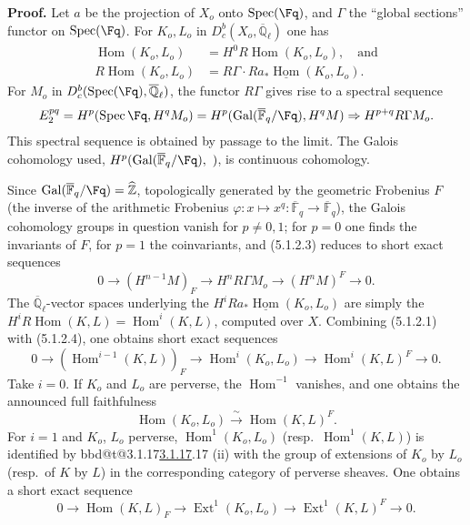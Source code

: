 \documentclass[12pt,oneside]{amsbook}
\makeatletter
\DeclareRobustCommand{\rn}[1]{%
  \ifcsname bbd@t@#1\endcsname\hyperlink{bbd:#1}{#1}\else#1\fi}
\theoremstyle{plain}
\theoremstyle{definition}
\newcommand{\Z}{\mathbb{Z}}   \newcommand{\D}{\mathcal{D}}
\newcommand{\Fbar}{\overline{\mathbb{F}}_{q}}
\newcommand{\Qlb}{\overline{\mathbb{Q}}_{\ell}}
\newcommand{\Dbc}{D^{b}_{c}}
\DeclareMathOperator{\Hom}{Hom}
\DeclareMathOperator{\Ext}{Ext}
\DeclareMathOperator{\Spec}{Spec}
\DeclareMathOperator{\Gal}{Gal}
\newcommand{\uHom}{\underline{\operatorname{Hom}}}
\makeatother
\begin{document}
\noindent\textbf{Proof.} Let $a$ be the projection of $X_{o}$ onto $\Spec(\Fq)$, and $\Gamma$ the ``global sections'' functor on $\Spec(\Fq)$. For $K_{o},L_{o}$ in $\Dbc(X_{o},\Qlb)$ one has
\begin{align}
  \Hom(K_{o},L_{o}) &= H^{0}R\Hom(K_{o},L_{o}),\quad\text{and}\\
  R\Hom(K_{o},L_{o}) &= R\Gamma\cdot Ra_{*}\uHom(K_{o},L_{o}).
\end{align}
For $M_{o}$ in $\Dbc(\Spec(\Fq),\Qlb)$, the functor $R\Gamma$ gives rise to a spectral sequence
\begin{equation}
  E^{pq}_{2}=H^{p}(\Spec\Fq,H^{q}M_{o})
  = H^{p}(\Gal(\Fbar/\Fq),H^{q}M)\Rightarrow H^{p+q}R\Gamma M_{o}.
\end{equation}
This spectral sequence is obtained by passage to the limit. The Galois cohomology used, $H^{p}(\Gal(\Fbar/\Fq),\ )$, is continuous cohomology.

Since $\Gal(\Fbar/\Fq)=\widehat{\Z}$, topologically generated by the geometric Frobenius $F$ (the inverse of the arithmetic Frobenius $\varphi:x\mapsto x^{q}:\Fbar\to\Fbar$), the Galois cohomology groups in question vanish for $p\ne 0,1$; for $p=0$ one finds the invariants of $F$, for $p=1$ the coinvariants, and (5.1.2.3) reduces to short exact sequences
\begin{equation}
  0\longrightarrow (H^{n-1}M)_{F}\longrightarrow H^{n}R\Gamma M_{o}
  \longrightarrow (H^{n}M)^{F}\longrightarrow 0.
\end{equation}
The $\Qlb$-vector spaces underlying the $H^{i}Ra_{*}\uHom(K_{o},L_{o})$ are simply the $H^{i}R\Hom(K,L)=\Hom^{i}(K,L)$, computed over $X$. Combining (5.1.2.1) with (5.1.2.4), one obtains short exact sequences
\begin{equation}
  0\longrightarrow (\Hom^{i-1}(K,L))_{F}\longrightarrow
  \Hom^{i}(K_{o},L_{o})\longrightarrow \Hom^{i}(K,L)^{F}\longrightarrow 0.
\end{equation}
Take $i=0$. If $K_{o}$ and $L_{o}$ are perverse, the $\Hom^{-1}$ vanishes, and one obtains the announced full faithfulness
\[
  \Hom(K_{o},L_{o})\xrightarrow{\ \sim\ }\Hom(K,L)^{F}.
\]
For $i=1$ and $K_{o}$, $L_{o}$ perverse, $\Hom^{1}(K_{o},L_{o})$ (resp.\ $\Hom^{1}(K,L)$) is identified by \rn{3.1.17} (ii) with the group of extensions of $K_{o}$ by $L_{o}$ (resp.\ of $K$ by $L$) in the corresponding category of perverse sheaves. One obtains a short exact sequence
\[
  0\to \Hom(K,L)_{F}\to \Ext^{1}(K_{o},L_{o})\to \Ext^{1}(K,L)^{F}\to 0.
\]
\end{document}
